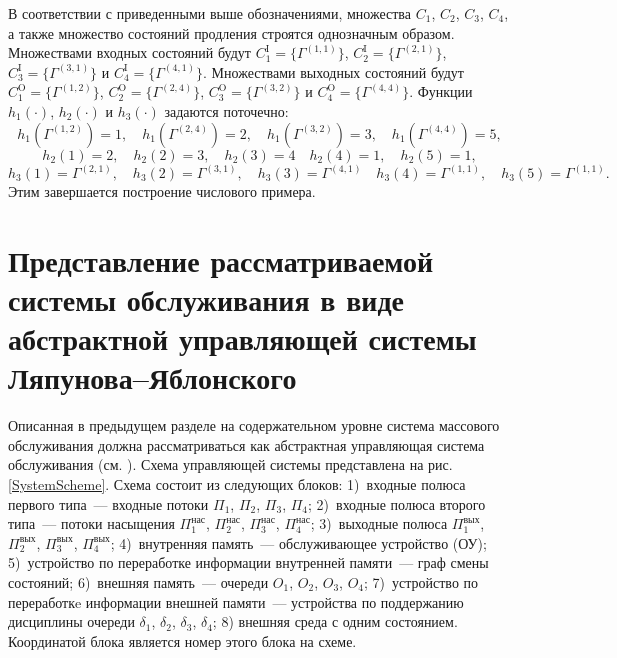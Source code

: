 В соответствии с приведенными выше обозначениями,   множества $C_1$,  $C_2$,  $C_3$,  $C_4$,  а также множество состояний продления строятся однозначным образом. Множествами входных состояний будут $C_1^{\mathrm{I}}=\{\Gamma^{(1,  1)}\}$,  $C_2^{\mathrm{I}}=\{\Gamma^{(2,  1)}\}$,  $C_3^{\mathrm{I}}=\{\Gamma^{(3,  1)}\}$ и $C_4^{\mathrm{I}}=\{\Gamma^{(4,  1)}\}$. Множествами выходных состояний будут $C_1^{\mathrm{O}}=\{\Gamma^{(1,  2)}\}$,  $C_2^{\mathrm{O}}=\{\Gamma^{(2,  4)}\}$,  $C_3^{\mathrm{O}}=\{\Gamma^{(3,  2)}\}$ и $C_4^{\mathrm{O}}=\{\Gamma^{(4,  4)}\}$. Функции $h_1(\cdot)$,  $h_2(\cdot)$ и $h_3(\cdot)$ задаются поточечно:
\begin{equation*}
h_1(\Gamma^{(1,  2)})=1,  \quad h_1(\Gamma^{(2,  4)})=2,  \quad h_1(\Gamma^{(3,   2)})=3,  \quad h_1(\Gamma^{(4,  4)})=5, 
\end{equation*}
\begin{equation*}
h_2(1)=2,  \quad h_2(2)=3,  \quad h_2(3)=4 \quad h_2(4)=1,  \quad h_2(5)=1, 
\end{equation*}
\begin{equation*}
h_3(1)=\Gamma^{(2, 1)},  \quad h_3(2)=\Gamma^{(3, 1)},  \quad h_3(3)=\Gamma^{(4, 1)} \quad h_3(4)=\Gamma^{(1, 1)},  \quad h_3(5)=\Gamma^{(1, 1)}.
\end{equation*}
Этим завершается построение числового примера.

\section{Представление рассматриваемой системы обслуживания в виде абстрактной управляющей системы Ляпунова--Яблонского}
Описанная в предыдущем разделе на содержательном уровне система массового обслуживания должна рассматриваться как абстрактная управляющая система обслуживания (см. \cite{Zorin:2011:2}). Схема управляющей системы представлена на рис. \ref{SystemScheme}. Схема состоит из следующих блоков: 1)~входные полюса первого типа~--- входные потоки $\Pi_1$,  $\Pi_2$,  $\Pi_3$,  $\Pi_4$; 2)~входные полюса второго типа~--- потоки насыщения $\Pi_1^{\mathrm{\text{нас}}}$,  $\Pi_2^{\mathrm{\text{нас}}}$,  $\Pi_3^{\mathrm{\text{нас}}}$,  $\Pi_4^{\mathrm{\text{нас}}}$; 3)~выходные полюса $\Pi_1^{\mathrm{\text{вых}}}$,  $\Pi_2^{\mathrm{\text{вых}}}$,  $\Pi_3^{\mathrm{\text{вых}}}$,  $\Pi_4^{\mathrm{\text{вых}}}$; 4)~внутренняя память~--- обслуживающее устройство (ОУ);  5)~устройство по переработке информации внутренней памяти~--- граф смены состояний;  6)~внешняя память~--- очереди $O_1$,  $O_2$,  $O_3$,  $O_4$; 7)~устройство по переработкe информации внешней памяти~--- устройства по поддержанию дисциплины очереди $\delta_1$,  $\delta_2$,  $\delta_3$,  $\delta_4$; 8) внешняя среда с одним состоянием. Координатой блока является номер этого блока на схеме.

